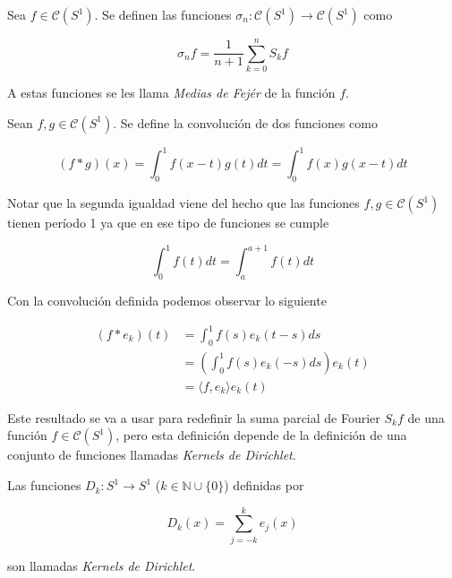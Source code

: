 \begin{definicion}
	Sea $f \in \mathcal{C}(S^1)$. Se definen las funciones $\sigma_n: \mathcal{C}(S^1) \rightarrow \mathcal{C}(S^1)$ como
	
	\begin{equation}
		\sigma_n f = \frac{1}{n+1} \sum_{k=0}^{n} S_k f
	\end{equation}
	
	A estas funciones se les llama \textit{Medias de Fejér} de la función $f$.
\end{definicion}

\begin{definicion}
	Sean $f,g \in \mathcal{C}(S^1)$. Se define la convolución de dos funciones como
	
	\begin{equation}
		(f*g)(x) = \int_{0}^{1} f(x-t)g(t)dt = \int_{0}^{1} f(x)g(x-t)dt
	\end{equation}
\end{definicion}

Notar que la segunda igualdad viene del hecho que las funciones $f,g \in \mathcal{C}(S^1)$ tienen período 1 ya que en ese tipo de funciones se cumple

\begin{equation}
	\int_{0}^{1} f(t)dt = \int_{a}^{a+1} f(t)dt
\end{equation}

Con la convolución definida podemos observar lo siguiente

\begin{align}
	(f*e_k)(t) &= \int_{0}^{1} f(s)e_k(t-s)ds\\
	&= \left( \int_{0}^{1} f(s) e_k(-s)ds \right) e_k(t)\\
	&= \langle f,e_k \rangle e_k(t)
\end{align}

Este resultado se va a usar para redefinir la suma parcial de Fourier $S_k f$ de una función $f \in \mathcal{C}(S^1)$, pero esta definición depende de la definición de una conjunto de funciones llamadas \textit{Kernels de Dirichlet}.

\begin{definicion}
	Las funciones $D_k: S^1 \rightarrow S^1$ ($k \in \mathbb{N} \cup \{0\}$) definidas por
	
	\begin{equation}
		D_k(x) = \sum_{j=-k}^{k} e_j(x)
	\end{equation}
	
	son llamadas \textit{Kernels de Dirichlet}. 
\end{definicion}

